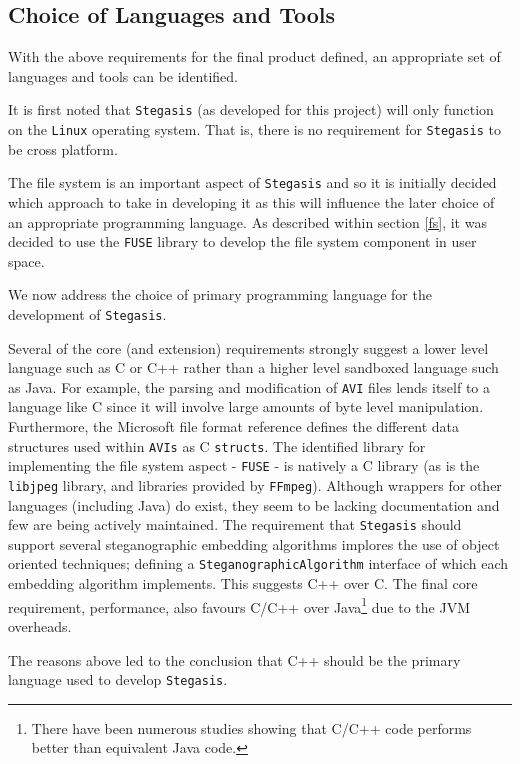 \documentclass[paper=a4, fontsize=11pt,twoside]{scrartcl}    %
\numberwithin{table}{section}
\numberwithin{figure}{section}
\numberwithin{algorithm}{section}
\begin{document}
\subsection{Choice of Languages and Tools}

With the above requirements for the final product defined, an appropriate set of languages and tools can be identified.

It is first noted that \texttt{Stegasis} (as developed for this project) will only function on the \texttt{Linux} operating system. That is, there is no requirement for \texttt{Stegasis} to be cross platform.  

The file system is an important aspect of \texttt{Stegasis} and so it is initially decided which approach to take in developing it as this will influence the later choice of an appropriate programming language. As described within section \ref{fs}, it was decided to use the \texttt{FUSE} library to develop the file system component in user space.

We now address the choice of primary programming language for the development of \texttt{Stegasis}.

Several of the core (and extension) requirements strongly suggest a lower level language such as C or C++ rather than a higher level sandboxed language such as Java. For example, the parsing and modification of \texttt{AVI} files lends itself to a language like C since it will involve large amounts of byte level manipulation. Furthermore, the Microsoft file format reference defines the different data structures used within \texttt{AVIs} as C \texttt{structs}. The identified library for implementing the file system aspect - \texttt{FUSE} - is natively a C library (as is the \texttt{libjpeg} library, and libraries provided by \texttt{FFmpeg}). Although wrappers for other languages (including Java) do exist, they seem to be lacking documentation and few are being actively maintained. The requirement that \texttt{Stegasis} should support several steganographic embedding algorithms implores the use of object oriented techniques; defining a \texttt{SteganographicAlgorithm} interface of which each embedding algorithm implements. This suggests C++ over C. The final core requirement, performance, also favours C/C++ over Java\footnote{There have been numerous studies showing that C/C++ code performs better than equivalent Java code.} due to the JVM overheads. 

The reasons above led to the conclusion that C++ should be the primary language used to develop \texttt{Stegasis}.
\end{document}
